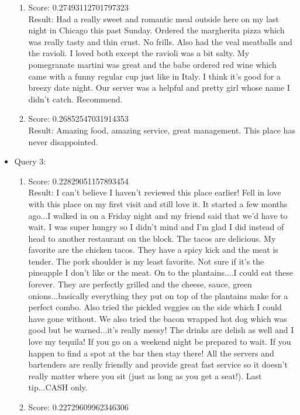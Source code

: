 \documentclass[paper=a4, fontsize=11pt]{jhwhw} %
\begin{document}
\begin{itemize}
\begin{enumerate}
\item Score: 0.27493112701797323\\
Result: Had a really sweet and romantic meal outside here on my last night in Chicago this past Sunday. Ordered the margherita pizza which was really tasty and thin crust. No frills. Also had the veal meatballs and the ravioli. I loved both except the ravioli was a bit salty. My pomegranate martini was great and the babe ordered red wine which came with a funny regular cup just like in Italy. I think it's good for a breezy date night. Our server was a helpful and pretty girl whose name I didn't catch. Recommend.
\item Score: 0.26852547031914353\\
Result: Amazing food, amazing service, great management. This place has never disappointed.
\end{enumerate}
\item Query 3:
\begin{enumerate}
\item Score: 0.22829051157893454\\
Result: I can't believe I haven't reviewed this place earlier! Fell in love with this place on my first visit and still love it. It started a few months ago...I walked in on a Friday night and my friend said that we'd have to wait. I was super hungry so I didn't mind and I'm glad I did instead of head to another restaurant on the block. The tacos are delicious. My favorite are the chicken tacos. They have a spicy kick and the meat is tender. The pork shoulder is my least favorite. Not sure if it's the pineapple I don't like or the meat. On to the plantains....I could eat these forever. They are perfectly grilled and the cheese, sauce, green onions...basically everything they put on top of the plantains make for a perfect combo. Also tried the pickled veggies on the side which I could have gone without. We also tried the bacon wrapped hot dog which was good but be warned...it's really messy! The drinks are delish as well and I love my tequila! If you go on a weekend night be prepared to wait. If you happen to find a spot at the bar then stay there! All the servers and bartenders are really friendly and provide great fast service so it doesn't really matter where you sit (just as long as you get a seat!). Last tip...CASH only.
\item Score: 0.22729609962346306\\

\end{enumerate}
\end{itemize}
\end{document}
